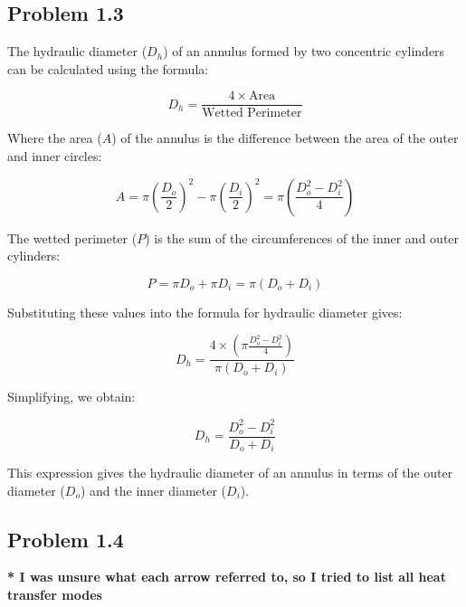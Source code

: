 \documentclass{article}
\begin{document}
\subsection{Problem 1.3}
The hydraulic diameter (\(D_h\)) of an annulus formed by two concentric cylinders can be calculated using the formula:

\[
D_h = \frac{4 \times \text{Area}}{\text{Wetted Perimeter}}
\]

Where the area (\(A\)) of the annulus is the difference between the area of the outer and inner circles:

\[
A = \pi \left( \frac{D_o}{2} \right)^2 - \pi \left( \frac{D_i}{2} \right)^2 = \pi \left( \frac{D_o^2 - D_i^2}{4} \right)
\]

The wetted perimeter (\(P\)) is the sum of the circumferences of the inner and outer cylinders:

\[
P = \pi D_o + \pi D_i = \pi (D_o + D_i)
\]

Substituting these values into the formula for hydraulic diameter gives:

\[
D_h = \frac{4 \times \left( \pi \frac{D_o^2 - D_i^2}{4} \right)}{\pi (D_o + D_i)}
\]

Simplifying, we obtain:

\[
D_h = \frac{D_o^2 - D_i^2}{D_o + D_i}
\]

This expression gives the hydraulic diameter of an annulus in terms of the outer diameter (\(D_o\)) and the inner diameter (\(D_i\)).

\subsection{Problem 1.4}
\textbf{* I was unsure what each arrow referred to, so I tried to list all heat transfer modes}
\end{document}
